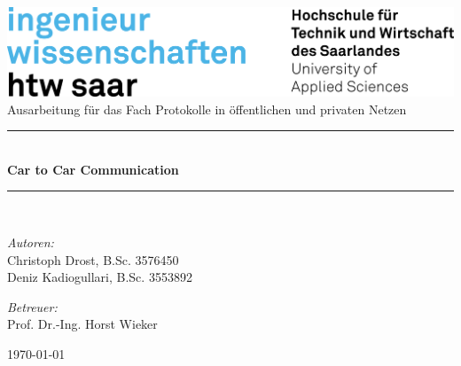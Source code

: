 \documentclass[12pt, a4paper, twoside, openright,ngerman]{scrreprt}
\begin{document}
\begin{titlepage}
		\begin{center}
			\includegraphics[width=.8\linewidth]{content/images/logos/logo_htw.png}\\[1cm]   
			
			\vspace{10 mm}
			Ausarbeitung für das Fach \glqq Protokolle in öffentlichen und privaten Netzen\grqq 
			\vspace{10 mm}	
			
			\newcommand{\HRule}{\rule{\linewidth}{0.5mm}} \HRule \\[0.4cm] { \huge \bfseries Car to Car Communication}\\[0.4cm]
			\HRule \\[1.5cm]

			\begin{minipage}{0.4\textwidth}
				\begin{flushleft} \large
					\emph{Autoren:}\\
					Christoph Drost, B.Sc. 3576450\\
					Deniz Kadiogullari, B.Sc. 3553892\\
				\end{flushleft}
			\end{minipage}
			\hfill
			\begin{minipage}{0.4\textwidth}
				\begin{flushright} \large
					\emph{Betreuer:} \\
					Prof. Dr.-Ing. Horst Wieker
				\end{flushright}
			\end{minipage}
			\vfill
			{\large \today}
		\end{center}
	\end{titlepage}


\listoftodos

\tableofcontents
\newpage 

\cleardoublepage




\cleardoublepage
{}
\label{abkuerzungsverzeichnis}
\begin{acronym}[LONGEST]
	
\end{acronym}   	 		

\nocite{*} 

\newpage
\sloppy
\printbibliography 



\newpage
\listoffigures
\end{document}
